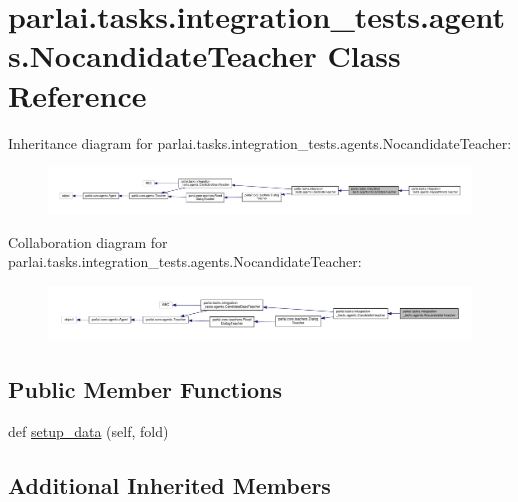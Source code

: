\hypertarget{classparlai_1_1tasks_1_1integration__tests_1_1agents_1_1NocandidateTeacher}{}\section{parlai.\+tasks.\+integration\+\_\+tests.\+agents.\+Nocandidate\+Teacher Class Reference}
\label{classparlai_1_1tasks_1_1integration__tests_1_1agents_1_1NocandidateTeacher}


Inheritance diagram for parlai.\+tasks.\+integration\+\_\+tests.\+agents.\+Nocandidate\+Teacher\+:
\nopagebreak
\begin{figure}[H]
\begin{center}
\leavevmode
\includegraphics[width=350pt]{d9/d5c/classparlai_1_1tasks_1_1integration__tests_1_1agents_1_1NocandidateTeacher__inherit__graph}
\end{center}
\end{figure}


Collaboration diagram for parlai.\+tasks.\+integration\+\_\+tests.\+agents.\+Nocandidate\+Teacher\+:
\nopagebreak
\begin{figure}[H]
\begin{center}
\leavevmode
\includegraphics[width=350pt]{d0/d48/classparlai_1_1tasks_1_1integration__tests_1_1agents_1_1NocandidateTeacher__coll__graph}
\end{center}
\end{figure}
\subsection*{Public Member Functions}
\begin{DoxyCompactItemize}
\item 
def \hyperlink{classparlai_1_1tasks_1_1integration__tests_1_1agents_1_1NocandidateTeacher_a0cf2accf985db966f44f77a7328fcff2}{setup\+\_\+data} (self, fold)
\end{DoxyCompactItemize}
\subsection*{Additional Inherited Members}


